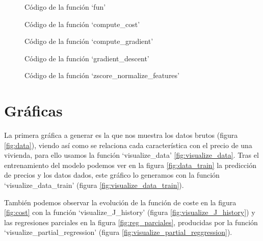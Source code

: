 \documentclass[6pt]{../../shared/AiTex}
\begin{document}
\begin{figure}[H]
    \centering
    
    \caption{Código de la función `fun'}
    \label{fig:fun}
\end{figure}

\begin{figure}[H]
    \centering
    
    \caption{Código de la función `compute\_cost'}
    \label{fig:compute_cost}
\end{figure}

\begin{figure}[H]
    \centering
    
    \caption{Código de la función `compute\_gradient'}
    \label{fig:compute_gradient}
\end{figure}

\begin{figure}[H]
    \centering
    
    \caption{Código de la función `gradient\_descent'}
    \label{fig:gradient_descent}
\end{figure}

\begin{figure}
    \centering
    
    \caption{Código de la función `zscore\_normalize\_features'}
    \label{fig:normalize}
\end{figure}

\section{Gráficas}

La primera gráfica a generar es la que nos muestra los datos brutos (figura \ref{fig:data}), viendo así como se relaciona cada característica con el precio de una vivienda, para ello usamos la función `visualize\_data' \ref{fig:visualize_data}. Tras el entrenamiento del modelo podemos ver en la figura \ref{fig:data_train} la predicción de precios y los datos dados, este gráfico lo generamos con la función `visualize\_data\_train' (figura \ref{fig:visualize_data_train}).

También podemos observar la evolución de la función de coste en la figura \ref{fig:cost} con la función `visualize\_J\_history' (figura \ref{fig:visualize_J_history}) y las regresiones parciales en la figura \ref{fig:reg_parciales}, producidas por la función `visualize\_partial\_regression' (figura \ref{fig:visualize_partial_reggression}).
\end{document}
